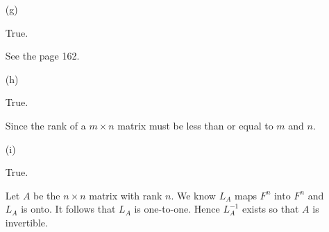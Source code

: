 \begin{Exercise}
\begin{enumerate}[(a)]
\item[(g)]
\begin{answer}
True.
\end{answer}
\begin{solution}
See the page 162.
\end{solution}

\item[(h)]
\begin{answer}
True.
\end{answer}
\begin{solution}
Since the rank of a $m\times n$ matrix must be less than or equal to $m$ and $n$.
\end{solution}

\item[(i)]
\begin{answer}
True.
\end{answer}
\begin{solution}
Let $A$ be the $n\times n$ matrix with rank $n$. We know $L_A$ maps $F^n$ into $F^n$ and $L_A$ is onto. It follows that $L_A$ is one-to-one. Hence $L_A^{-1}$ exists so that $A$ is invertible.
\end{solution}

\end{enumerate}
\end{Exercise}